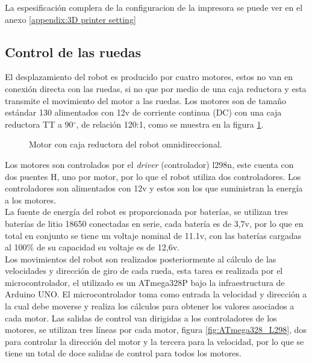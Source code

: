 \documentclass{iccmemoria}
\begin{document}
La espesificación complera de la configuracion de la impresora se puede ver en el anexo \ref{appendix:3D printer setting}

\subsection{Control de las ruedas}

El desplazamiento del robot es producido por cuatro motores, estos no van en conexión directa con las ruedas, si no que por medio de una caja reductora y esta transmite el movimiento del motor a las ruedas. Los motores son de tamaño estándar 130 alimentados con 12v de corriente continua (DC) con una caja reductora TT a 90$^{\circ}$, de relación 120:1, como se muestra en la figura \ref{fig:motor}.\\

\begin{figure}[H]
  \centering
  
  \caption[Motor con caja reductora del robot omnidireccional.]{Motor con caja reductora del robot omnidireccional.}
  \label{fig:motor}
\end{figure}

Los motores son controlados por el \emph{driver} (controlador) l298n, este cuenta con dos puentes H, uno por motor, por lo que el robot utiliza dos controladores. Los controladores son alimentados con 12v y estos son los que suministran la energía a los motores.\\

La fuente de energía del robot es proporcionada por baterías, se utilizan tres baterías de litio 18650 conectadas en serie, cada batería es de 3,7v, por lo que en total en conjunto se tiene un voltaje nominal de 11.1v, con las baterías cargadas al 100\% de su capacidad su voltaje es de 12,6v.\\

Los movimientos del robot son realizados posteriormente al cálculo de las velocidades y dirección de giro de cada rueda, esta tarea es realizada por el microcontrolador, el utilizado es un ATmega328P bajo la infraestructura de Arduino UNO. El microcontrolador toma como entrada la velocidad y dirección a la cual debe moverse y realiza los cálculos para obtener los valores asociados a cada motor. Las salidas de control van dirigidas a los controladores de los motores, se utilizan tres líneas por cada motor, figura \ref{fig:ATmega328_L298}, dos para controlar la dirección del motor y la tercera para la velocidad, por lo que se tiene un total de doce salidas de control para todos los motores.\\
\end{document}

